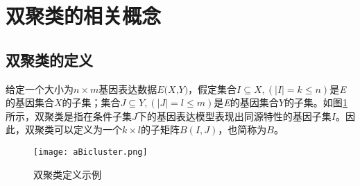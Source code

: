 \section{双聚类的相关概念}

  \subsection{双聚类的定义}
  给定一个大小为$n\times m$基因表达数据$\textit{E(X,Y)}$，假定集合$I\subseteq X,(|I| = k \leq n)$是\textit{E}的基因集合$X$的子集；集合$J\subseteq Y,(|J| = l \leq m)$是\textit{E}的基因集合$Y$的子集。如图\ref{fig:define_bic}所示，双聚类是指在条件子集$J$下的基因表达模型表现出同源特性的基因子集$I$。因此，双聚类可以定义为一个$k \times l$的子矩阵$B(I, J)$，也简称为$B$。
  \begin{figure}[htbp]
      \centering
  \texttt{[image: aBicluster.png]}
  \caption{双聚类定义示例}
  \label{fig:define_bic}
  \end{figure}


